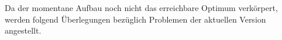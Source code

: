 Da der momentane Aufbau noch nicht das erreichbare Optimum verkörpert, werden folgend Überlegungen bezüglich Problemen der aktuellen Version angestellt.